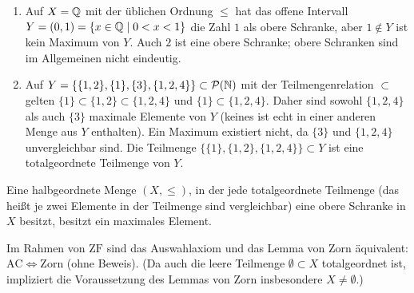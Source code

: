 \begin{beispiel}
\begin{enumerate}
    \item Auf $X=\mathbb{Q}$ mit der üblichen Ordnung $\le$ hat das offene Intervall
    $Y=(0,1)=\{x\in\mathbb{Q}\mid 0<x<1\}$ die Zahl $1$ als obere Schranke, aber
    $1\notin Y$ ist kein Maximum von $Y$. Auch $2$ ist eine obere Schranke;
    obere Schranken sind im Allgemeinen nicht eindeutig.
    \item Auf $Y=\{\{1,2\},\{1\},\{3\},\{1,2,4\}\}\subset\mathcal{P}(\mathbb{N})$ mit der
    Teilmengenrelation $\subset$ gelten
    $\{1\}\subset\{1,2\}\subset\{1,2,4\}$ und $\{1\}\subset\{1,2,4\}$.
    Daher sind sowohl $\{1,2,4\}$ als auch $\{3\}$ maximale Elemente von $Y$
    (keines ist echt in einer anderen Menge aus $Y$ enthalten). Ein Maximum
    existiert nicht, da $\{3\}$ und $\{1,2,4\}$ unvergleichbar sind.
    Die Teilmenge $\{\{1\},\{1,2\},\{1,2,4\}\}\subset Y$ ist eine
    totalgeordnete Teilmenge von $Y$.
\end{enumerate}
\end{beispiel}

\begin{satz}
Eine halbgeordnete Menge $(X,\le)$, in der jede totalgeordnete Teilmenge
(das heißt je zwei Elemente in der Teilmenge sind vergleichbar) eine
obere Schranke in $X$ besitzt, besitzt ein maximales Element.
\end{satz}

\begin{bemerkung}[Äquivalenz zu AC]
Im Rahmen von $\mathrm{ZF}$ sind das Auswahlaxiom und das Lemma von Zorn
äquivalent: $\mathrm{AC}\iff\text{Zorn}$ (ohne Beweis).
(Da auch die leere Teilmenge $\emptyset\subset X$ totalgeordnet ist,
impliziert die Voraussetzung des Lemmas von Zorn insbesondere $X\ne\emptyset$.)
\end{bemerkung}
